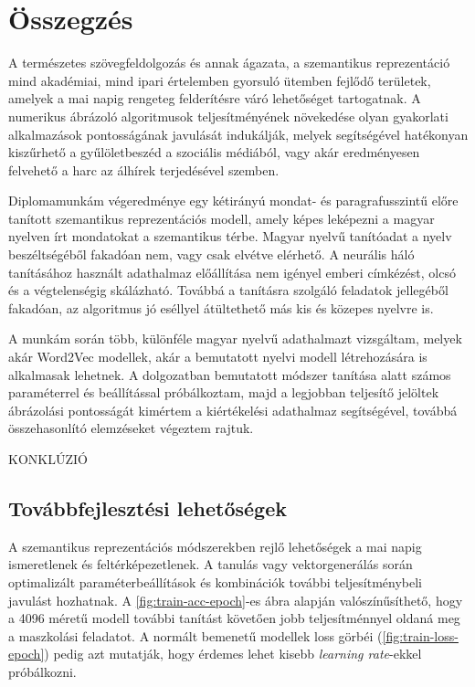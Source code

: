 \chapter{Összegzés} %
\label{ch:sum}

A természetes szövegfeldolgozás és annak ágazata, a szemantikus reprezentáció mind akadémiai, mind ipari értelemben gyorsuló ütemben fejlődő területek, amelyek a mai napig rengeteg felderítésre váró lehetőséget tartogatnak. A numerikus ábrázoló algoritmusok teljesítményének növekedése olyan gyakorlati alkalmazások pontosságának javulását indukálják, melyek segítségével hatékonyan kiszűrhető a gyűlöletbeszéd a szociális médiából, vagy akár eredményesen felvehető a harc az álhírek terjedésével szemben. 

Diplomamunkám végeredménye egy kétirányú mondat- és paragrafusszintű előre tanított szemantikus reprezentációs modell, amely képes leképezni a magyar nyelven írt mondatokat a szemantikus térbe. Magyar nyelvű tanítóadat a nyelv beszéltségéből fakadóan nem, vagy csak elvétve elérhető. A neurális háló tanításához használt adathalmaz előállítása nem igényel emberi címkézést, olcsó és a végtelenségig skálázható. Továbbá a tanításra szolgáló feladatok jellegéből fakadóan, az algoritmus jó eséllyel átültethető más kis és közepes nyelvre is.

A munkám során több, különféle magyar nyelvű adathalmazt vizsgáltam, melyek akár Word2Vec modellek, akár a bemutatott nyelvi modell létrehozására is alkalmasak lehetnek. A dolgozatban bemutatott módszer tanítása alatt számos paraméterrel és beállítással próbálkoztam, majd a legjobban teljesítő jelöltek ábrázolási pontosságát  kimértem a kiértékelési adathalmaz segítségével, továbbá összehasonlító elemzéseket végeztem rajtuk.

KONKLÚZIÓ

\section{Továbbfejlesztési lehetőségek}
A szemantikus reprezentációs módszerekben rejlő lehetőségek a mai napig ismeretlenek és feltérképezetlenek. A tanulás vagy vektorgenerálás során optimalizált paraméterbeállítások és kombinációk további teljesítménybeli javulást hozhatnak. A \ref{fig:train-acc-epoch}-es ábra alapján valószínűsíthető, hogy a 4096 méretű modell további tanítást követően jobb teljesítménnyel oldaná meg a maszkolási feladatot. A normált bemenetű modellek loss görbéi (\ref{fig:train-loss-epoch}) pedig azt mutatják, hogy érdemes lehet kisebb \textit{learning rate}-ekkel próbálkozni.


